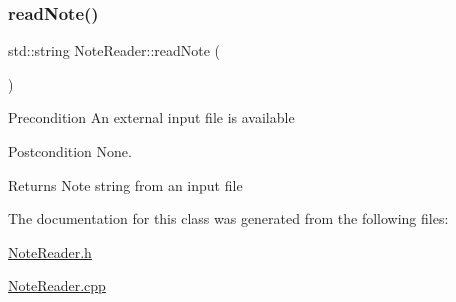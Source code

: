 \subsubsection{\texorpdfstring{read\+Note()}{readNote()}}
{\footnotesize\ttfamily std\+::string Note\+Reader\+::read\+Note (\begin{DoxyParamCaption}{ }\end{DoxyParamCaption})}

\begin{DoxyPrecond}{Precondition}
An external input file is available 
\end{DoxyPrecond}
\begin{DoxyPostcond}{Postcondition}
None. 
\end{DoxyPostcond}
\begin{DoxyReturn}{Returns}
Note string from an input file 
\end{DoxyReturn}


The documentation for this class was generated from the following files\+:\begin{DoxyCompactItemize}
\item 
\hyperlink{_note_reader_8h}{Note\+Reader.\+h}\item 
\hyperlink{_note_reader_8cpp}{Note\+Reader.\+cpp}\end{DoxyCompactItemize}
